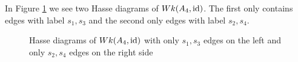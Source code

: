 
\begin{exam}
	In Figure \ref{fig:a4_s1s3-and-a4_s2s4} we see two Hasse diagrams of $Wk(A_4, \operatorname{id})$. The first only contains edges with label $s_1,s_3$ and the second only edges with label $s_2,s_4$.
	\begin{figure}[ht]
		\centering
		
		\quad \quad \quad
		
		\caption{Hasse diagrams of $Wk(A_4, \operatorname{id})$ with only $s_1,s_3$ edges on the left and only $s_2,s_4$ edges on the right side}
		\label{fig:a4_s1s3-and-a4_s2s4}
	\end{figure}
\end{exam}